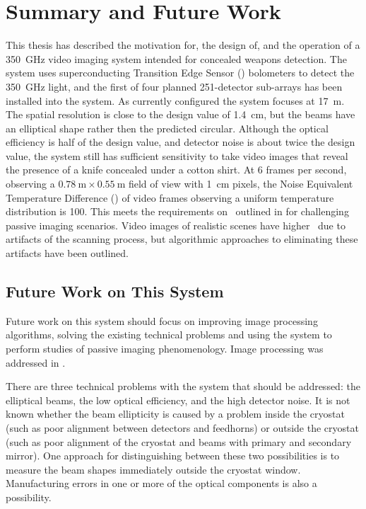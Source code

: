 \chapter{Summary and Future Work} \label{c:summary}

This thesis has described the motivation for, the design of, and the operation of a \SI{350}{\GHz} video imaging system intended for concealed weapons detection.
The system uses superconducting Transition Edge Sensor (\TES) bolometers to detect the \SI{350}{\GHz} light, and the first of four planned 251-detector sub-arrays has been installed into the system.
As currently configured the system focuses at \SI{17}{\m}.
The spatial resolution is close to the design value of \SI{1.4}{\cm}, but the beams have an elliptical shape rather then the predicted circular.
Although the optical efficiency is half of the design value, and detector noise is about twice the design value, the system still has sufficient sensitivity to take video images that reveal the presence of a knife concealed under a cotton shirt.
At 6 frames per second, observing a $\SI{0.78}{\m} \times \SI{0.55}{\m}$ field of view with \SI{1}{\cm} pixels, the Noise Equivalent Temperature Difference (\NETD) of video frames observing a uniform temperature distribution is \SI{100}{\mK}.
This meets the requirements on \NETD\ outlined in  for challenging passive imaging scenarios.
Video images of realistic scenes have higher \NETD\ due to artifacts of the scanning process, but algorithmic approaches to eliminating these artifacts have been outlined.

\section{Future Work on This System}

Future work on this system should focus on improving image processing algorithms, solving the existing technical problems and using the system to perform studies of passive imaging phenomenology.
Image processing was addressed in .

There are three technical problems with the system that should be addressed: the elliptical beams, the low optical efficiency, and the high detector noise.
It is not known whether the beam ellipticity is caused by a problem inside the cryostat (such as poor alignment between detectors and feedhorns) or outside the cryostat (such as poor alignment of the cryostat and beams with primary and secondary mirror).
One approach for distinguishing between these two possibilities is to measure the beam shapes immediately outside the cryostat window.
Manufacturing errors in one or more of the optical components is also a possibility.

